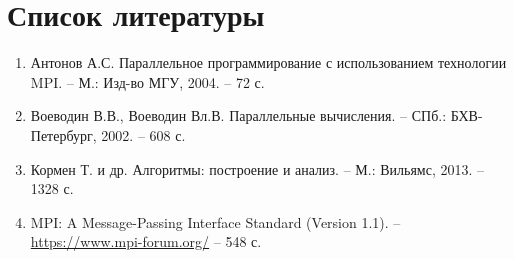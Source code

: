 \documentclass[14pt,a4paper]{article}
\begin{document}
\section*{Список литературы}
\begin{enumerate}
    \item Антонов А.С. Параллельное программирование с использованием технологии MPI. – М.: Изд-во МГУ, 2004. – 72 с.
    \item Воеводин В.В., Воеводин Вл.В. Параллельные вычисления. – СПб.: БХВ-Петербург, 2002. – 608 с.
    \item Кормен Т. и др. Алгоритмы: построение и анализ. – М.: Вильямс, 2013. – 1328 с.
    \item MPI: A Message-Passing Interface Standard (Version 1.1). – \url{https://www.mpi-forum.org/} – 548 с.
\end{enumerate}
\end{document}
